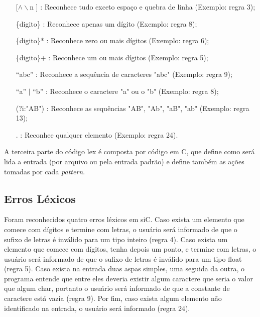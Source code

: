 \documentclass[12pt]{article}
\begin{document}
\begin{itemize}
  \item[[$\wedge\backslash$n]] : Reconhece tudo exceto espaço e quebra de linha (Exemplo: regra 3);
  \item[\{digito\}] : Reconhece apenas um dígito (Exemplo: regra 8);
  \item[\{digito\}*] : Reconhece zero ou mais dígitos (Exemplo: regra 6);
  \item[\{digito\}+] : Reconhece um ou mais dígitos (Exemplo: regra 5);
  \item[``abc''] : Reconhece a sequência de caracteres "abc" (Exemplo: regra 9);
  \item[``a'' $\vert$ ``b''] : Reconhece o caractere "a" ou o "b" (Exemplo: regra 8);
  \item[(?i:"AB")] : Reconhece as sequências "AB", "Ab", "aB", "ab" (Exemplo: regra 13);
  \item[.] : Reconhee qualquer elemento (Exemplo: regra 24).
\end{itemize}

\indent A terceira parte do código lex é composta por código em C, que define como será lida a entrada (por arquivo ou pela entrada padrão) e define também as ações tomadas por cada \textit{pattern}.

\subsection{Erros Léxicos}

\indent Foram reconhecidos quatro erros léxicos em siC. Caso exista um elemento que comece com dígitos e termine com letras, o usuário será informado de que o sufixo de letras é inválido para um tipo inteiro (regra 4). Caso exista um elemento que comece com dígitos, tenha depois um ponto, e termine com letras, o usuário será informado de que o sufixo de letras é inválido para um tipo float (regra 5). Caso exista na entrada duas aspas simples, uma seguida da outra, o programa entende que entre eles deveria existir algum caractere que seria o valor que algum char, portanto o usuário será informado de que a constante de caractere está vazia (regra 9). Por fim, caso exista algum elemento não identificado na entrada, o usuário será informado (regra 24).
\end{document}
